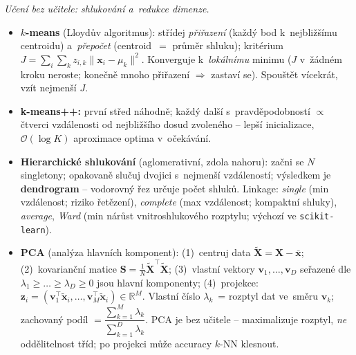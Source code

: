 \begin{poznamka}
\smallskip
\emph{Učení bez učitele: shlukování a~redukce dimenze.}
\begin{itemize}
  \item \textbf{$k$-means} (Lloydův algoritmus): střídej \emph{přiřazení} (každý bod k~nejbližšímu centroidu) a~\emph{přepočet} (centroid~$=$ průměr shluku); kritérium $J=\sum_i\sum_k z_{i,k}\|\mathbf{x}_i-\mu_k\|^2$. Konverguje k~\emph{lokálnímu} minimu ($J$ v~žádném kroku neroste; konečně mnoho přiřazení $\Rightarrow$ zastaví se). Spouštět vícekrát, vzít nejmenší $J$.
  \item \textbf{k-means++:} první střed náhodně; každý další s~pravděpodobností $\propto$ čtverci vzdálenosti od nejbližšího dosud zvoleného -- lepší inicializace, $\mathcal O(\log K)$ aproximace optima v~očekávání.
  \item \textbf{Hierarchické shlukování} (aglomerativní, zdola nahoru): začni se $N$ singletony; opakovaně slučuj dvojici s~nejmenší vzdáleností; výsledkem je \textbf{dendrogram} -- vodorovný řez určuje počet shluků. Linkage: \emph{single} (min vzdálenost; riziko řetězení), \emph{complete} (max vzdálenost; kompaktní shluky), \emph{average}, \emph{Ward} (min nárůst vnitroshlukového rozptylu; výchozí ve \texttt{scikit-learn}).
  \item \textbf{PCA} (analýza hlavních komponent): (1)~centruj data $\tilde{\mathbf{X}}=\mathbf{X}-\bar{\mathbf{x}}$; (2)~kovarianční matice $\mathbf{S}=\tfrac1N\tilde{\mathbf{X}}^\top\tilde{\mathbf{X}}$; (3)~vlastní vektory $\mathbf{v}_1,\dots,\mathbf{v}_D$ seřazené dle $\lambda_1\ge\dots\ge\lambda_D\ge0$ jsou hlavní komponenty; (4)~projekce: $\mathbf{z}_i=(\mathbf{v}_1^\top\tilde{\mathbf{x}}_i,\dots,\mathbf{v}_M^\top\tilde{\mathbf{x}}_i)\in\mathbb{R}^M$. Vlastní číslo $\lambda_k$~= rozptyl dat ve~směru $\mathbf{v}_k$; zachovaný podíl $=\dfrac{\sum_{k=1}^M\lambda_k}{\sum_{k=1}^D\lambda_k}$. PCA je bez učitele -- maximalizuje rozptyl, \emph{ne} oddělitelnost tříd; po projekci může accuracy $k$-NN klesnout.
\end{itemize}
\end{poznamka}

